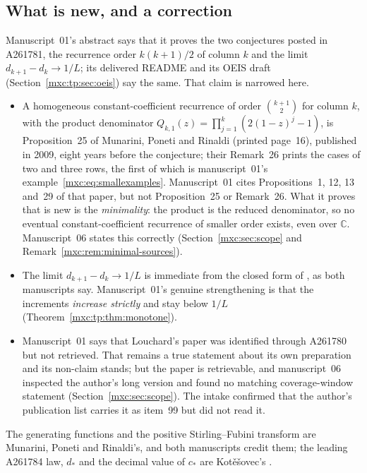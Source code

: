 \documentclass[11pt]{article}
\numberwithin{equation}{section}
\theoremstyle{definition}
\theoremstyle{remark}
\begin{document}
\subsection{What is new, and a correction}\label{mxc:tp:sec:novelty}
Manuscript~01's abstract says that it proves the two conjectures posted in
A261781, the recurrence order $k(k+1)/2$ of column $k$ and the limit
$d_{k+1}-d_k\to1/L$; its delivered README and its OEIS draft
(Section~\ref{mxc:tp:sec:oeis}) say the same. That claim is narrowed here.
\begin{itemize}
\item A homogeneous constant-coefficient recurrence of order
 $\binom{k+1}{2}$ for column $k$, with the product denominator
 $Q_{k,1}(z)=\prod_{j=1}^k(2(1-z)^j-1)$, is Proposition~25 of Munarini,
 Poneti and Rinaldi \cite{mpr2009} (printed page~16), published in 2009,
 eight years before the conjecture; their Remark~26 prints the cases of
 two and three rows, the first of which is manuscript~01's
 example~\eqref{mxc:eq:smallexamples}. Manuscript~01 cites Propositions~1,
 12, 13 and~29 of that paper, but not Proposition~25 or Remark~26. What
 it proves that is new is the \emph{minimality}: the product is the
 reduced denominator, so no eventual constant-coefficient recurrence of
 smaller order exists, even over $\mathbb C$. Manuscript~06 states this
 correctly (Section~\ref{mxc:sec:scope} and
 Remark~\ref{mxc:rem:minimal-sources}).
\item The limit $d_{k+1}-d_k\to1/L$ is immediate from the closed form of
 \cite[Proposition~13]{mpr2009}, as both manuscripts say. Manuscript~01's
 genuine strengthening is that the increments \emph{increase strictly}
 and stay below $1/L$ (Theorem~\ref{mxc:tp:thm:monotone}).
\item Manuscript~01 says that Louchard's paper \cite{louchard} was
 identified through A261780 but not retrieved. That remains a true
 statement about its own preparation and its non-claim stands; but the
 paper is retrievable, and manuscript~06 inspected the author's long
 version and found no matching coverage-window statement
 (Section~\ref{mxc:sec:scope}). The intake confirmed that the author's
 publication list carries it as item~99 but did not read it.
\end{itemize}
The generating functions and the positive Stirling--Fubini transform are
Munarini, Poneti and Rinaldi's, and both manuscripts credit them; the
leading A261784 law, $d_*$ and the decimal value of $c_*$ are
Kot\v{e}\v{s}ovec's \cite{oeis784}.
\end{document}
